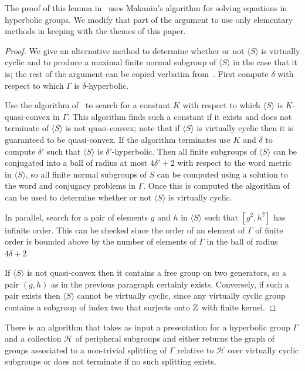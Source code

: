 The proof of this lemma in~\cite{dahmaniguirardel11} uses Makanin's algorithm
for solving equations in hyperbolic groups. We modify that part of the argument
to use only elementary methods in keeping with the themes of this paper.

\begin{proof} We give an alternative method to determine whether or not
$\langle S\rangle$ is virtually cyclic and to produce a maximal finite normal
subgroup of $\langle S\rangle$ in the case that it is; the rest of the
argument can be copied verbatim from~\cite{dahmaniguirardel11}. First compute
$\delta$ with respect to which $\Gamma$ is $\delta$-hyperbolic.

Use the algorithm of~\cite[Proposition 4]{kapovich96} to search for a constant
$K$ with respect to which $\langle S\rangle$ is $K$-quasi-convex in $\Gamma$.
This algorithm finds such a constant if it exists and does not terminate of
$\langle S\rangle$ is not quasi-convex; note that if $\langle S\rangle$ is
virtually cyclic then it is guaranteed to be quasi-convex. If the algorithm
terminates use $K$ and $\delta$ to compute $\delta'$ such that $\langle
S\rangle$ is $\delta'$-hyperbolic.  Then all finite subgroups of $\langle
S\rangle$ can be conjugated into a ball of radius at most $4\delta' + 2$ with
respect to the word metric in $\langle S\rangle$, so all finite normal
subgroups of $S$ can be computed using a solution to the word and conjugacy
problems in $\Gamma$. Once this is computed the algorithm
of~\cite{dahmaniguirardel11} can be used to determine whether or not $\langle
S\rangle$ is virtually cyclic.

In parallel, search for a pair of elements $g$ and $h$ in $\langle S\rangle$
such that $[g^2, h^2]$ has infinite order. This can be checked since the order
of an element of $\Gamma$ of finite order is bounded above by the number of
elements of $\Gamma$ in the ball of radius $4\delta + 2$.

If $\langle S\rangle$ is not quasi-convex then it contains a free group on two
generators, so a pair $(g, h)$ as in the previous paragraph certainly exists.
Conversely, if such a pair exists then $\langle S\rangle$ cannot be virtually cyclic,
since any virtually cyclic group contains a subgroup of index two that surjects onto
$\mathbb{Z}$ with finite kernel.  \end{proof}

\begin{lem}\label{lem:findingasplitting} There is an algorithm that takes as
  input a presentation for a hyperbolic group $\Gamma$ and a collection
  $\mathcal{H}$ of peripheral subgroups and either returns the graph of groups
  associated to a non-trivial splitting of $\Gamma$ relative to $\mathcal{H}$
over virtually cyclic subgroups or does not terminate if no such splitting
exists.  \end{lem}

